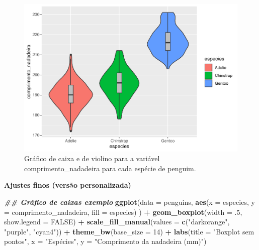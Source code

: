 \documentclass[
]{article}
\newenvironment{Shaded}{\begin{snugshade}}{\end{snugshade}}
\newcommand{\AttributeTok}[1]{\textcolor[rgb]{0.13,0.29,0.53}{#1}}
\newcommand{\ConstantTok}[1]{\textcolor[rgb]{0.56,0.35,0.01}{#1}}
\newcommand{\DecValTok}[1]{\textcolor[rgb]{0.00,0.00,0.81}{#1}}
\newcommand{\DocumentationTok}[1]{\textcolor[rgb]{0.56,0.35,0.01}{\textbf{\textit{#1}}}}
\newcommand{\FunctionTok}[1]{\textcolor[rgb]{0.13,0.29,0.53}{\textbf{#1}}}
\newcommand{\NormalTok}[1]{#1}
\newcommand{\SpecialCharTok}[1]{\textcolor[rgb]{0.81,0.36,0.00}{\textbf{#1}}}
\newcommand{\StringTok}[1]{\textcolor[rgb]{0.31,0.60,0.02}{#1}}
\begin{document}
\begin{figure}
\centering
\includegraphics{epr_files/figure-latex/fig-boxplot-violin-1.pdf}
\caption{\label{fig:fig-boxplot-violin}Gráfico de caixa e de violino para a variável comprimento\_nadadeira para cada espécie de penguim.}
\end{figure}

\textbf{Ajustes finos (versão personalizada)}

\begin{Shaded}
\begin{Highlighting}[]
\DocumentationTok{\#\# Gráfico de caixas exemplo}
\FunctionTok{ggplot}\NormalTok{(}\AttributeTok{data =}\NormalTok{ penguins, }
       \FunctionTok{aes}\NormalTok{(}\AttributeTok{x =}\NormalTok{ especies, }\AttributeTok{y =}\NormalTok{ comprimento\_nadadeira, }\AttributeTok{fill =}\NormalTok{ especies)}
\NormalTok{       ) }\SpecialCharTok{+}
    \FunctionTok{geom\_boxplot}\NormalTok{(}\AttributeTok{width =}\NormalTok{ .}\DecValTok{5}\NormalTok{, }\AttributeTok{show.legend =} \ConstantTok{FALSE}\NormalTok{) }\SpecialCharTok{+}
    \FunctionTok{scale\_fill\_manual}\NormalTok{(}\AttributeTok{values =} \FunctionTok{c}\NormalTok{(}\StringTok{"darkorange"}\NormalTok{, }\StringTok{"purple"}\NormalTok{, }\StringTok{"cyan4"}\NormalTok{)) }\SpecialCharTok{+}
    \FunctionTok{theme\_bw}\NormalTok{(}\AttributeTok{base\_size =} \DecValTok{14}\NormalTok{) }\SpecialCharTok{+}
    \FunctionTok{labs}\NormalTok{(}\AttributeTok{title =} \StringTok{"Boxplot sem pontos"}\NormalTok{, }\AttributeTok{x =} \StringTok{"Espécies"}\NormalTok{, }\AttributeTok{y =} \StringTok{"Comprimento da nadadeira (mm)"}\NormalTok{)}
\end{Highlighting}
\end{Shaded}
\end{document}
